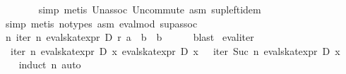 \begin{isabellebody}
\ \ \ \ \ \ \isamarkupfalse%
\ {}simp{}\ metis\ Un{}assoc\ Un{}commute\ asm\ sup{}left{}idem{}\isanewline
\ \ \ \ \ \ \isamarkupfalse%
\ {}simp{}\ metis\ {}no{}types{}\ asm\ eval{}mod{}\ sup{}assoc{}\isanewline
\ \ \isamarkupfalse%
\isanewline
\ \ \isamarkupfalse%
\ {}{}{}n{}\ iter\ n\ {}eval{}skat{}expr\ D\ r{}\ a{}\ {}\ b\ {}\ b{}\isanewline
\ \ \ \ \isamarkupfalse%
\ blast\isanewline
{}\isamarkupfalse%
%
\endisatagproof
{\isafoldproof}%
%
\isadelimproof
\isanewline
%
\endisadelimproof
\isanewline
{}\isamarkupfalse%
\ eval{}iter{}\isanewline
\ \ {}iter\ n\ {}eval{}skat{}expr\ D\ x{}\ {}eval{}skat{}expr\ D\ x\ {}{}\ {}\ iter\ {}Suc\ n{}\ {}eval{}skat{}expr\ D\ x{}\ {}{}\isanewline
%
\isadelimproof
\ \ %
\endisadelimproof
%
\isatagproof
{}\isamarkupfalse%
\ {}induct\ n{}\ auto{}%

\end{isabellebody}
